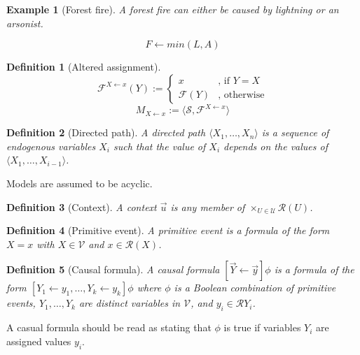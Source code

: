 \documentclass{iosart2c}
\newcommand{\assignment}[2]{#1 \leftarrow #2}
\newcommand{\pair}[2]{\langle#1,#2\rangle}
\newcommand{\range}[2]{#1,\ldots,#2}
\newcommand{\sequence}[2]{\langle#1,\ldots,#2\rangle}
\newtheorem{definition}{Definition}
\newtheorem{example}{Example}
\begin{document}
\begin{example}[Forest fire]
\label{ex:forest_fire}
A forest fire can either be caused by lightning or an arsonist.
\end{example}

\begin{equation}
\label{eq:forest_fire}
F \leftarrow min(L,A)
\end{equation}

\begin{definition}[Altered assignment]
\label{def:altered_assignment}
\[
  \mathcal{F}^{X \leftarrow x}(Y)
:=
  \left\{
    \begin{array}{ll}
      x              & \text{, if $Y = X$}\\
      \mathcal{F}(Y) & \text{, otherwise}
    \end{array}
  \right.
\]
\[
  M_{X \leftarrow x}
:=
  \pair{\mathcal{S}}{\mathcal{F}^{X \leftarrow x}}
\]
\end{definition}

\begin{definition}[Directed path]
\label{def:directed_path}
A directed path $\sequence{X_1}{X_n}$ is a sequence of endogenous variables $X_i$ such that the value of $X_i$ depends on the values of $\sequence{X_1}{X_{i-1}}$.
\end{definition}

Models are assumed to be acyclic.

\begin{definition}[Context]
\label{def:context}
A context $\vec{u}$ is any member of $\times_{U \in \mathcal{U}} \mathcal{R}(U)$.
\end{definition}

\begin{definition}[Primitive event]
\label{def:primitive_event}
A primitive event is a formula of the form $X = x$ with $X \in \mathcal{V}$ and $x \in \mathcal{R}(X)$.
\end{definition}

\begin{definition}[Causal formula]
\label{def:causal_formula}
A causal formula $[\assignment{\vec{Y}}{\vec{y}}]\phi$ is a formula of the form $[\range{\assignment{Y_1}{y_1}}{\assignment{Y_k}{y_k}}]\phi$ where $\phi$ is a Boolean combination of primitive events, $\range{Y_1}{Y_k}$ are distinct variables in $\mathcal{V}$, and $y_i \in \mathcal{R}{Y_i}$.
\end{definition}

A casual formula should be read as stating that $\phi$ is true if variables $Y_i$ are assigned values $y_i$.
\end{document}
